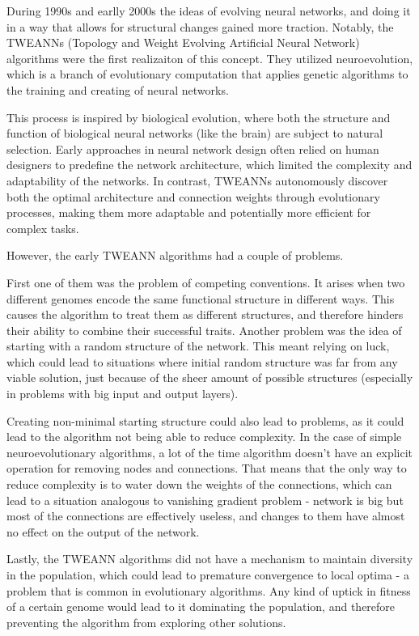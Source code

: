 \documentclass{article}
\begin{document}
During 1990s and earlly 2000s the ideas of evolving neural networks, and doing it in a way that allows for structural changes gained more traction. 
Notably, the TWEANNs (Topology and Weight Evolving Artificial Neural Network) algorithms were the first realizaiton of this concept.
They utilized neuroevolution, which is a branch of evolutionary computation that applies genetic algorithms to the training and creating of neural networks.

This process is inspired by biological evolution, where both the structure and function of biological neural networks (like the brain)
are subject to natural selection. 
Early approaches in neural network design often relied on human designers to predefine the network architecture,
which limited the complexity and adaptability of the networks. In contrast, TWEANNs autonomously discover both the optimal architecture and connection weights through evolutionary processes, making them more adaptable and potentially more efficient for complex tasks.

However, the early TWEANN algorithms had a couple of problems. 

First one of them was the problem of competing conventions. It arises when two different genomes encode the same
functional structure in different ways. This causes the algorithm to treat them as different structures, and therefore hinders
their ability to combine their successful traits.
Another problem was the idea of starting with a random structure of the network.
This meant relying on luck, which could lead to situations where initial random structure was far from any viable solution,
just because of the sheer amount of possible structures (especially in problems with big input and output layers).

Creating non-minimal starting structure could also lead to problems, as it could lead to the algorithm not being able to reduce complexity.
In the case of simple neuroevolutionary algorithms, a lot of the time algorithm doesn't have an explicit operation for removing nodes and
connections. That means that the only way to reduce complexity is to water down the weights of the connections, which can lead to a situation
analogous to vanishing gradient problem - network is big but most of the connections are effectively useless, and changes to them have 
almost no effect on the output of the network. 

Lastly, the TWEANN algorithms did not have a mechanism to maintain diversity in the population,
which could lead to premature convergence to local optima -  a problem that is common in evolutionary algorithms.
Any kind of uptick in fitness of a certain genome would lead to it dominating the population, and therefore preventing the algorithm from exploring other solutions.  
\end{document}
